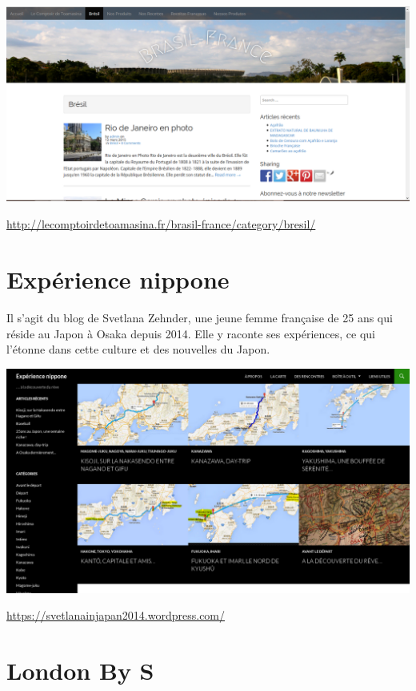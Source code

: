 \begin{center}
	\includegraphics[scale=0.25]{Toamasina.png}
\end{center}
\url{http://lecomptoirdetoamasina.fr/brasil-france/category/bresil/}

\section{Expérience nippone}

\paragraph{} Il s'agit du blog de Svetlana Zehnder, une jeune femme française
de 25 ans qui réside au Japon à Osaka depuis 2014. Elle y raconte ses
expériences, ce qui l'étonne dans cette culture et des nouvelles du Japon.

\begin{center}
	\includegraphics[scale=0.25]{Svetlana.png}
\end{center}
\url{https://svetlanainjapan2014.wordpress.com/}

\section{London By S}
